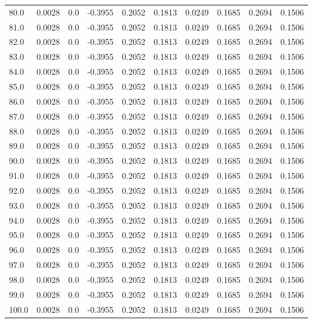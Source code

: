 \begin{longtable}{lrrrrrrrrr}
80.0 & 0.0028 & 0.0 & -0.3955 & 0.2052 & 0.1813 & 0.0249 & 0.1685 & 0.2694 & 0.1506 \\
81.0 & 0.0028 & 0.0 & -0.3955 & 0.2052 & 0.1813 & 0.0249 & 0.1685 & 0.2694 & 0.1506 \\
82.0 & 0.0028 & 0.0 & -0.3955 & 0.2052 & 0.1813 & 0.0249 & 0.1685 & 0.2694 & 0.1506 \\
83.0 & 0.0028 & 0.0 & -0.3955 & 0.2052 & 0.1813 & 0.0249 & 0.1685 & 0.2694 & 0.1506 \\
84.0 & 0.0028 & 0.0 & -0.3955 & 0.2052 & 0.1813 & 0.0249 & 0.1685 & 0.2694 & 0.1506 \\
85.0 & 0.0028 & 0.0 & -0.3955 & 0.2052 & 0.1813 & 0.0249 & 0.1685 & 0.2694 & 0.1506 \\
86.0 & 0.0028 & 0.0 & -0.3955 & 0.2052 & 0.1813 & 0.0249 & 0.1685 & 0.2694 & 0.1506 \\
87.0 & 0.0028 & 0.0 & -0.3955 & 0.2052 & 0.1813 & 0.0249 & 0.1685 & 0.2694 & 0.1506 \\
88.0 & 0.0028 & 0.0 & -0.3955 & 0.2052 & 0.1813 & 0.0249 & 0.1685 & 0.2694 & 0.1506 \\
89.0 & 0.0028 & 0.0 & -0.3955 & 0.2052 & 0.1813 & 0.0249 & 0.1685 & 0.2694 & 0.1506 \\
90.0 & 0.0028 & 0.0 & -0.3955 & 0.2052 & 0.1813 & 0.0249 & 0.1685 & 0.2694 & 0.1506 \\
91.0 & 0.0028 & 0.0 & -0.3955 & 0.2052 & 0.1813 & 0.0249 & 0.1685 & 0.2694 & 0.1506 \\
92.0 & 0.0028 & 0.0 & -0.3955 & 0.2052 & 0.1813 & 0.0249 & 0.1685 & 0.2694 & 0.1506 \\
93.0 & 0.0028 & 0.0 & -0.3955 & 0.2052 & 0.1813 & 0.0249 & 0.1685 & 0.2694 & 0.1506 \\
94.0 & 0.0028 & 0.0 & -0.3955 & 0.2052 & 0.1813 & 0.0249 & 0.1685 & 0.2694 & 0.1506 \\
95.0 & 0.0028 & 0.0 & -0.3955 & 0.2052 & 0.1813 & 0.0249 & 0.1685 & 0.2694 & 0.1506 \\
96.0 & 0.0028 & 0.0 & -0.3955 & 0.2052 & 0.1813 & 0.0249 & 0.1685 & 0.2694 & 0.1506 \\
97.0 & 0.0028 & 0.0 & -0.3955 & 0.2052 & 0.1813 & 0.0249 & 0.1685 & 0.2694 & 0.1506 \\
98.0 & 0.0028 & 0.0 & -0.3955 & 0.2052 & 0.1813 & 0.0249 & 0.1685 & 0.2694 & 0.1506 \\
99.0 & 0.0028 & 0.0 & -0.3955 & 0.2052 & 0.1813 & 0.0249 & 0.1685 & 0.2694 & 0.1506 \\
100.0 & 0.0028 & 0.0 & -0.3955 & 0.2052 & 0.1813 & 0.0249 & 0.1685 & 0.2694 & 0.1506 \\

\end{longtable}
